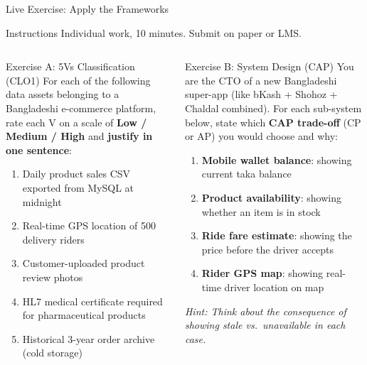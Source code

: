 \documentclass[aspectratio=169,10pt]{beamer}
\begin{document}
\begin{frame}{Live Exercise: Apply the Frameworks}
  \begin{block}{Instructions}
    Individual work, 10 minutes.  Submit on paper or LMS.
  \end{block}
  \vspace{6pt}
  \begin{columns}[T]
      \begin{exampleblock}{Exercise A: 5Vs Classification (CLO1)}
        For each of the following data assets belonging to a Bangladeshi e-commerce platform, rate each V on a scale of \textbf{Low / Medium / High} and \textbf{justify in one sentence}:
        \vspace{4pt}
        \begin{enumerate}[(1)]
          \item Daily product sales CSV exported from MySQL at midnight
          \item Real-time GPS location of 500 delivery riders
          \item Customer-uploaded product review photos
          \item HL7 medical certificate required for pharmaceutical products
          \item Historical 3-year order archive (cold storage)
        \end{enumerate}
      \end{exampleblock}

      \begin{alertblock}{Exercise B: System Design (CAP)}
        You are the CTO of a new Bangladeshi super-app (like bKash + Shohoz + Chaldal combined).  For each sub-system below, state which \textbf{CAP trade-off} (CP or AP) you would choose and why:
        \vspace{4pt}
        \begin{enumerate}[(1)]
          \item \textbf{Mobile wallet balance}: showing current taka balance
          \item \textbf{Product availability}: showing whether an item is in stock
          \item \textbf{Ride fare estimate}: showing the price before the driver accepts
          \item \textbf{Rider GPS map}: showing real-time driver location on map
        \end{enumerate}
        \vspace{4pt}
        \textit{Hint: Think about the consequence of showing \emph{stale} vs.\ \emph{unavailable} in each case.}
      \end{alertblock}
  \end{columns}
\end{frame}
\end{document}
